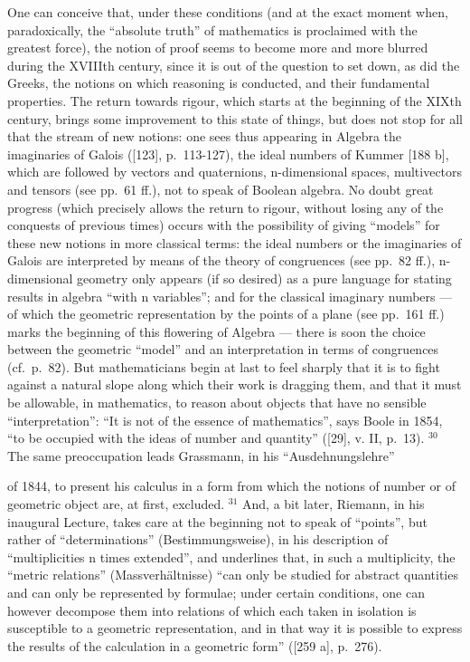 One can conceive that, under these conditions (and at the exact moment when, paradoxically, the ``absolute truth'' of mathematics is proclaimed with the greatest force), the notion of proof seems to become more and more blurred during the XVIIIth century, since it is out of the question to set down, as did the Greeks, the notions on which reasoning is conducted, and their fundamental properties. The return towards rigour, which starts at the beginning of the XIXth century, brings some improvement to this state of things, but does not stop for all that the stream of new notions: one sees thus appearing in Algebra the imaginaries of Galois ({[}123{]}, p.~113-127), the ideal numbers of Kummer {[}188 b{]}, which are followed by vectors and quaternions, n-dimensional spaces, multivectors and tensors (see pp.~61 ff.), not to speak of Boolean algebra. No doubt great progress (which precisely allows the return to rigour, without losing any of the conquests of previous times) occurs with the possibility of giving ``models'' for these new notions in more classical terms: the ideal numbers or the imaginaries of Galois are interpreted by means of the theory of congruences (see pp.~82 ff.), n-dimensional geometry only appears (if so desired) as a pure language for stating results in algebra ``with n variables''; and for the classical imaginary numbers --- of which the geometric representation by the points of a plane (see pp.~161 ff.) marks the beginning of this flowering of Algebra --- there is soon the choice between the geometric ``model'' and an interpretation in terms of congruences (cf.~p.~82). But mathematicians begin at last to feel sharply that it is to fight against a natural slope along which their work is dragging them, and that it must be allowable, in mathematics, to reason about objects that have no sensible ``interpretation'': ``It is not of the essence of mathematics'', says Boole in 1854, ``to be occupied with the ideas of number and quantity'' ({[}29{]}, v. II, p.~13). \(^{30}\) The same preoccupation leads Grassmann, in his ``Ausdehnungslehre''

of 1844, to present his calculus in a form from which the notions of number or of geometric object are, at first, excluded. \(^{31}\) And, a bit later, Riemann, in his inaugural Lecture, takes care at the beginning not to speak of ``points'', but rather of ``determinations'' (Bestimmungsweise), in his description of ``multiplicities n times extended'', and underlines that, in such a multiplicity, the ``metric relations'' (Massverhältnisse) ``can only be studied for abstract quantities and can only be represented by formulae; under certain conditions, one can however decompose them into relations of which each taken in isolation is susceptible to a geometric representation, and in that way it is possible to express the results of the calculation in a geometric form'' ({[}259 a{]}, p.~276).

